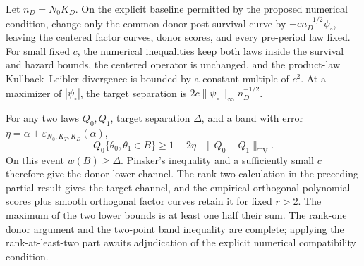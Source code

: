 Let \(n_D=N_0K_D\).  On the explicit baseline permitted by the proposed numerical condition, change only the common donor-post survival curve by \(\pm c n_D^{-1/2}\psi_\circ\), leaving the centered factor curves, donor scores, and every pre-period law fixed.  For small fixed \(c\), the numerical inequalities keep both laws inside the survival and hazard bounds, the centered operator is unchanged, and the product-law Kullback--Leibler divergence is bounded by a constant multiple of \(c^2\).  At a maximizer of \(|\psi_\circ|\), the target separation is \(2c\|\psi_\circ\|_\infty n_D^{-1/2}\).

For any two laws \(Q_0,Q_1\), target separation \(\Delta\), and a band with error \(\eta=\alpha+\varepsilon_{N_0,K_T,K_D}(\alpha)\),
\[
 Q_0\{\theta_0,\theta_1\in B\}
 \ge1-2\eta-\|Q_0-Q_1\|_{\mathrm{TV}}.
\]
On this event \(w(B)\ge\Delta\).  Pinsker's inequality and a sufficiently small \(c\) therefore give the donor lower channel.  The rank-two calculation in the preceding partial result gives the target channel, and the empirical-orthogonal polynomial scores plus smooth orthogonal factor curves retain it for fixed \(r>2\).  The maximum of the two lower bounds is at least one half their sum.  The rank-one donor argument and the two-point band inequality are complete; applying the rank-at-least-two part awaits adjudication of the explicit numerical compatibility condition.